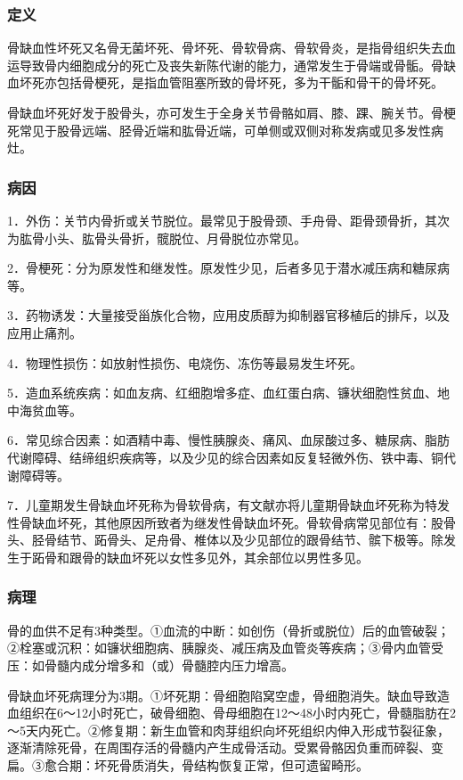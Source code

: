 \subsubsection{定义}

骨缺血性坏死又名骨无菌坏死、骨坏死、骨软骨病、骨软骨炎，是指骨组织失去血运导致骨内细胞成分的死亡及丧失新陈代谢的能力，通常发生于骨端或骨骺。骨缺血坏死亦包括骨梗死，是指血管阻塞所致的骨坏死，多为干骺和骨干的骨坏死。

骨缺血坏死好发于股骨头，亦可发生于全身关节骨骼如肩、膝、踝、腕关节。骨梗死常见于股骨远端、胫骨近端和肱骨近端，可单侧或双侧对称发病或见多发性病灶。

\subsubsection{病因}

1．外伤：关节内骨折或关节脱位。最常见于股骨颈、手舟骨、距骨颈骨折，其次为肱骨小头、肱骨头骨折，髋脱位、月骨脱位亦常见。

2．骨梗死：分为原发性和继发性。原发性少见，后者多见于潜水减压病和糖尿病等。

3．药物诱发：大量接受甾族化合物，应用皮质醇为抑制器官移植后的排斥，以及应用止痛剂。

4．物理性损伤：如放射性损伤、电烧伤、冻伤等最易发生坏死。

5．造血系统疾病：如血友病、红细胞增多症、血红蛋白病、镰状细胞性贫血、地中海贫血等。

6．常见综合因素：如酒精中毒、慢性胰腺炎、痛风、血尿酸过多、糖尿病、脂肪代谢障碍、结缔组织疾病等，以及少见的综合因素如反复轻微外伤、铁中毒、铜代谢障碍等。

7．儿童期发生骨缺血坏死称为骨软骨病，有文献亦将儿童期骨缺血坏死称为特发性骨缺血坏死，其他原因所致者为继发性骨缺血坏死。骨软骨病常见部位有：股骨头、胫骨结节、跖骨头、足舟骨、椎体以及少见部位的跟骨结节、髌下极等。除发生于跖骨和跟骨的缺血坏死以女性多见外，其余部位以男性多见。

\subsubsection{病理}

骨的血供不足有3种类型。①血流的中断：如创伤（骨折或脱位）后的血管破裂；②栓塞或沉积：如镰状细胞病、胰腺炎、减压病及血管炎等疾病；③骨内血管受压：如骨髓内成分增多和（或）骨髓腔内压力增高。

骨缺血坏死病理分为3期。①坏死期：骨细胞陷窝空虚，骨细胞消失。缺血导致造血组织在6～12小时死亡，破骨细胞、骨母细胞在12～48小时内死亡，骨髓脂肪在2～5天内死亡。②修复期：新生血管和肉芽组织向坏死组织内伸入形成节裂征象，逐渐清除死骨，在周围存活的骨髓内产生成骨活动。受累骨骼因负重而碎裂、变扁。③愈合期：坏死骨质消失，骨结构恢复正常，但可遗留畸形。

